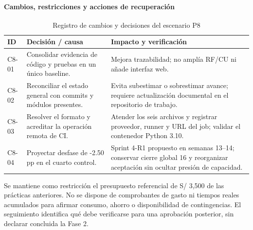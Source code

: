 \paragraph*{Cambios, restricciones y acciones de recuperación}
\begin{table}[H]
\centering\small{}
\caption{Registro de cambios y decisiones del escenario P8}
\begin{tabularx}{\textwidth}{P{2.4cm}YY}
\toprule
\textbf{ID} & \textbf{Decisión / causa} & \textbf{Impacto y verificación} \\
\midrule
C8-01 & Consolidar evidencia de código y pruebas en un único baseline. & Mejora trazabilidad; no amplía RF/CU ni añade interfaz web. \\
\addlinespace
C8-02 & Reconciliar el estado general con commits y módulos presentes. & Evita subestimar o sobrestimar avance; requiere actualización documental en el repositorio de trabajo. \\
\addlinespace
C8-03 & Resolver el formato y acreditar la operación remota de CI. & Atender los seis archivos y registrar proveedor, runner y URL del job; validar el contenedor Python 3.10. \\
\addlinespace
C8-04 & Proyectar desfase de -2.50 pp en el cuarto control. & Sprint 4-R1 propuesto en semanas 13--14; conservar cierre global 16 y reorganizar aceptación sin ocultar presión de capacidad. \\
\bottomrule
\end{tabularx}
\end{table}
Se mantiene como restricción el presupuesto referencial de S/ 3,500 de las prácticas anteriores. No se dispone de comprobantes de gasto ni tiempos reales acumulados para afirmar consumo, ahorro o disponibilidad de contingencias. El seguimiento identifica qué debe verificarse para una aprobación posterior, sin declarar concluida la Fase 2.


\clearpage
\endgroup
